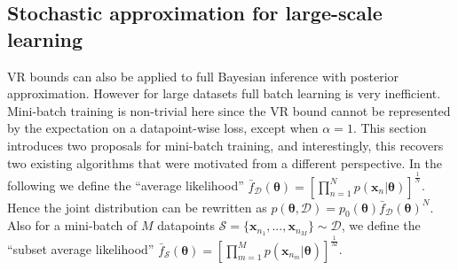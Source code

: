 \subsection{Stochastic approximation for large-scale learning}
\label{sec:large_scale_learning}
VR bounds can also be applied to full Bayesian inference with posterior approximation. However for large datasets full batch learning is very inefficient. Mini-batch training is non-trivial here since the VR bound cannot be represented by the expectation on a datapoint-wise loss, except when $\alpha = 1$. This section introduces two proposals for mini-batch training, and interestingly, this recovers two existing algorithms that were motivated from a different perspective.
%
In the following we define the ``average likelihood'' $\bar{f}_{\mathcal{D}}(\bm{\theta}) = [\prod_{n=1}^N p(\bm{x}_n|\bm{\theta})]^{\frac{1}{N}}$. Hence the joint distribution can be rewritten as $p(\bm{\theta}, \mathcal{D}) = p_0(\bm{\theta}) \bar{f}_{\mathcal{D}}(\bm{\theta})^N$. Also for a mini-batch of $M$ datapoints $\mathcal{S} = \{\bm{x}_{n_1}, ..., \bm{x}_{n_M} \} \sim \mathcal{D}$, we define the ``subset average likelihood'' $\bar{f}_{\mathcal{S}}(\bm{\theta}) = [\prod_{m=1}^M p(\bm{x}_{n_m}|\bm{\theta})]^{\frac{1}{M}}$.


